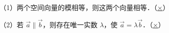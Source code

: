 \documentclass[fontset=none]{ctexart}
\begin{document}
\hsize=86.26mm
\noindent\mbox{（1）}两个空间向量的模相等，则这两个向量相等．\hfill\mbox{（\underline{×}）}\hspace*{5.4mm}\par
\noindent\mbox{（2）}若 \(\overrightarrow{a}\parallel\overrightarrow{b}\)，则存在唯一实数 \(\lambda\)，使 \(\overrightarrow{a}=\lambda\overrightarrow{b}\)．\hfill\mbox{（\underline{×}）}\hspace*{5.4mm}\par
\end{document}
